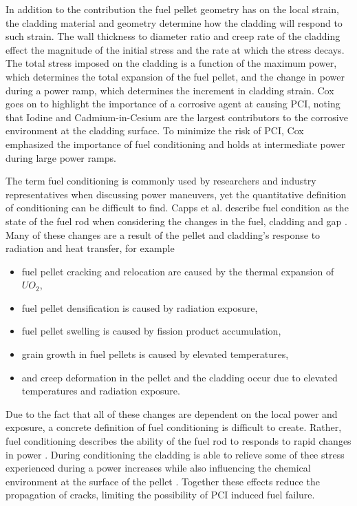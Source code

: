 \documentclass[edeposit,fullpage,11pt]{uiucthesis2009}
\begin{document}
In addition to the contribution the fuel pellet geometry has on the local strain, the cladding material and geometry determine how the cladding will respond to such strain.
The wall thickness to diameter ratio and creep rate of the cladding effect the magnitude of the initial stress and the rate at which the stress decays.
The total stress imposed on the cladding is a function of the maximum power, which determines the total expansion of the fuel pellet, and the change in power during a power ramp, which determines the increment in cladding strain.
Cox goes on to highlight the importance of a corrosive agent at causing \gls{PCI}, noting that Iodine and Cadmium-in-Cesium are the largest contributors to the corrosive environment at the cladding surface.
To minimize the risk of \gls{PCI}, Cox emphasized the importance of fuel conditioning and holds at intermediate power during large power ramps.

The term fuel conditioning is commonly used by researchers and industry representatives when discussing power maneuvers, yet the quantitative definition of conditioning can be difficult to find.
Capps et al. describe fuel condition as the state of the fuel rod when considering the changes in the fuel, cladding and gap \cite{capps_evaluation_2016}.
Many of these changes are a result of the pellet and cladding's response to radiation and heat transfer, for example
\begin{itemize}
\item fuel pellet cracking and relocation are caused by the thermal expansion of $UO_2$,
\item fuel pellet densification is caused by radiation exposure,
\item fuel pellet swelling is caused by fission product accumulation,
\item grain growth in fuel pellets is caused by elevated temperatures,
\item and creep deformation in the pellet and the cladding occur due to elevated temperatures and radiation exposure.
\end{itemize}
Due to the fact that all of these changes are dependent on the local power and exposure, a concrete definition of fuel conditioning is difficult to create.
Rather, fuel conditioning describes the ability of the fuel rod to responds to rapid changes in power \cite{capps_evaluation_2016}.
During conditioning the cladding is able to relieve some of thee stress experienced during a power increases while also influencing the chemical environment at the surface of the pellet \cite{cox_pellet-clad_1990}.
Together these effects reduce the propagation of cracks, limiting the possibility of \gls{PCI} induced fuel failure.
\end{document}
